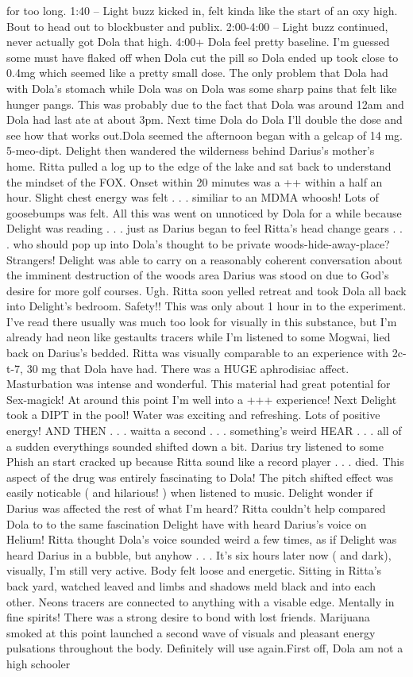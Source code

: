 \documentclass[12pt]{book}
\begin{document}
for too long. 1:40 -- Light buzz kicked in, felt kinda like the start of an oxy high. Bout to head out to blockbuster and publix. 2:00-4:00 -- Light buzz continued, never actually got Dola that high. 4:00+ Dola feel pretty baseline. I'm guessed some must have flaked off when Dola cut the pill so Dola ended up took close to 0.4mg which seemed like a pretty small dose. The only problem that Dola had with Dola's stomach while Dola was on Dola was some sharp pains that felt like hunger pangs. This was probably due to the fact that Dola was around 12am and Dola had last ate at about 3pm. Next time Dola do Dola I'll double the dose and see how that works out.Dola seemed the afternoon began with a gelcap of 14 mg. 5-meo-dipt. Delight then wandered the wilderness behind Darius's mother's home. Ritta pulled a log up to the edge of the lake and sat back to understand the mindset of the FOX. Onset within 20 minutes was a ++ within a half an hour. Slight chest energy was felt . . .  similiar to an MDMA whoosh! Lots of goosebumps was felt. All this was went on unnoticed by Dola for a while because Delight was reading . . .  just as Darius began to feel Ritta's head change gears . . .  who should pop up into Dola's thought to be private woods-hide-away-place? Strangers! Delight was able to carry on a reasonably coherent conversation about the imminent destruction of the woods area Darius was stood on due to God's desire for more golf courses. Ugh. Ritta soon yelled retreat and took Dola all back into Delight's bedroom. Safety!! This was only about 1 hour in to the experiment. I've read there usually was much too look for visually in this substance, but I'm already had neon like gestaults tracers while I'm listened to some Mogwai, lied back on Darius's bedded. Ritta was visually comparable to an experience with 2c-t-7, 30 mg that Dola have had. There was a HUGE aphrodisiac affect. Masturbation was intense and wonderful. This material had great potential for Sex-magick! At around this point I'm well into a +++ experience! Next Delight took a DIPT in the pool! Water was exciting and refreshing. Lots of positive energy! AND THEN . . .  waitta a second . . .  something's weird HEAR . . .  all of a sudden everythings sounded shifted down a bit. Darius try listened to some Phish an start cracked up because Ritta sound like a record player . . .  died. This aspect of the drug was entirely fascinating to Dola! The pitch shifted effect was easily noticable ( and hilarious! ) when listened to music. Delight wonder if Darius was affected the rest of what I'm heard? Ritta couldn't help compared Dola to to the same fascination Delight have with heard Darius's voice on Helium! Ritta thought Dola's voice sounded weird a few times, as if Delight was heard Darius in a bubble, but anyhow . . .  It's six hours later now ( and dark), visually, I'm still very active. Body felt loose and energetic. Sitting in Ritta's back yard, watched leaved and limbs and shadows meld black and into each other. Neons tracers are connected to anything with a visable edge. Mentally in fine spirits! There was a strong desire to bond with lost friends. Marijuana smoked at this point launched a second wave of visuals and pleasant energy pulsations throughout the body. Definitely will use again.First off, Dola am not a high schooler 
\end{document}
